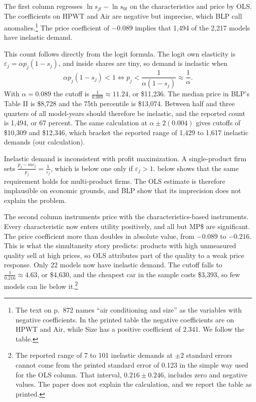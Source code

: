The first column regresses $\ln s_{jt}-\ln s_{0t}$ on the characteristics and price by OLS. The
coefficients on HPWT and Air are negative but imprecise, which BLP call anomalies.\footnote{The text
on p.~872 names ``air conditioning and size'' as the variables with negative coefficients. In the
printed table the negative coefficients are on HPWT and Air, while Size has a positive coefficient of
2.341. We follow the table.} The price coefficient of $-0.089$ implies that 1,494 of the 2,217 models
have inelastic demand.

This count follows directly from the logit formula. The logit own elasticity is
$\varepsilon_j=\alpha p_j(1-s_j)$, and inside shares are tiny, so demand is inelastic when
\begin{equation*}
\alpha p_j(1-s_j)<1
\iff p_j<\frac{1}{\alpha(1-s_j)}\approx\frac{1}{\alpha}.
\end{equation*}
With $\alpha=0.089$ the cutoff is $\frac{1}{0.089}\approx 11.24$, or \$11,236. The median price in
BLP's Table II is \$8,728 and the 75th percentile is \$13,074. Between half and three quarters of all
model-years should therefore be inelastic, and the reported count is 1,494, or 67 percent. The same
calculation at $\alpha\pm2(0.004)$ gives cutoffs of \$10,309 and \$12,346, which bracket the reported
range of 1,429 to 1,617 inelastic demands (our calculation).

Inelastic demand is inconsistent with profit maximization. A single-product firm sets
$\frac{p_j-mc_j}{p_j}=\frac{1}{\varepsilon_j}$, which is below one only if $\varepsilon_j>1$.
 below shows that the same requirement holds for multi-product firms. The OLS
estimate is therefore implausible on economic grounds, and BLP show that its imprecision does not
explain the problem.

The second column instruments price with the characteristics-based instruments. Every characteristic
now enters utility positively, and all but MP\$ are significant. The price coefficient more than
doubles in absolute value, from $-0.089$ to $-0.216$. This is what the simultaneity story predicts:
products with high unmeasured quality sell at high prices, so OLS attributes part of the quality to a
weak price response. Only 22 models now have inelastic demand. The cutoff falls to
$\frac{1}{0.216}\approx 4.63$, or \$4,630, and the cheapest car in the sample costs \$3,393, so few
models can lie below it.\footnote{The reported range of 7 to 101 inelastic demands at $\pm2$ standard
errors cannot come from the printed standard error of 0.123 in the simple way used for the OLS column.
That interval, $0.216\pm0.246$, includes zero and negative values. The paper does not explain the
calculation, and we report the table as printed.}

